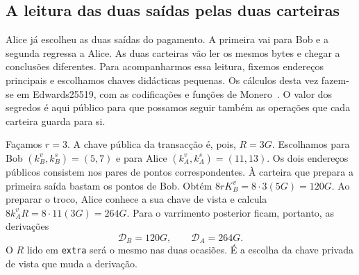 \subsection{A leitura das duas saídas pelas duas carteiras}
\label{sec:dois-destinos-varrimento}

Alice já escolheu as duas saídas do pagamento. A primeira vai para
Bob e a segunda regressa a Alice. As duas carteiras vão ler os
mesmos bytes e chegar a conclusões diferentes. Para acompanharmos
essa leitura, fixemos endereços principais e escolhamos chaves
didácticas pequenas. Os cálculos desta vez fazem-se em Edwards25519,
com as codificações e funções de Monero~\cite{monero-source-v16}.
O valor dos segredos é aqui público para que possamos seguir também
as operações que cada carteira guarda para si.

Façamos \(r=3\). A chave pública da transacção é, pois, \(R=3G\).
Escolhamos para Bob \((k_B^v,k_B^s)=(5,7)\) e para Alice
\((k_A^v,k_A^s)=(11,13)\). Os dois endereços públicos consistem nos
pares de pontos correspondentes. À carteira que prepara a primeira
saída bastam os pontos de Bob. Obtém \(8rK_B^v=8\cdot3(5G)=120G\).
Ao preparar o troco, Alice conhece a sua chave de vista e calcula
\(8k_A^vR=8\cdot11(3G)=264G\). Para o varrimento posterior
ficam, portanto, as derivações
\[
 \mathcal D_B=120G,\qquad \mathcal D_A=264G.
\]
O \(R\) lido em \texttt{extra} será o mesmo nas duas ocasiões.
É a escolha da chave privada de vista que muda a derivação.

